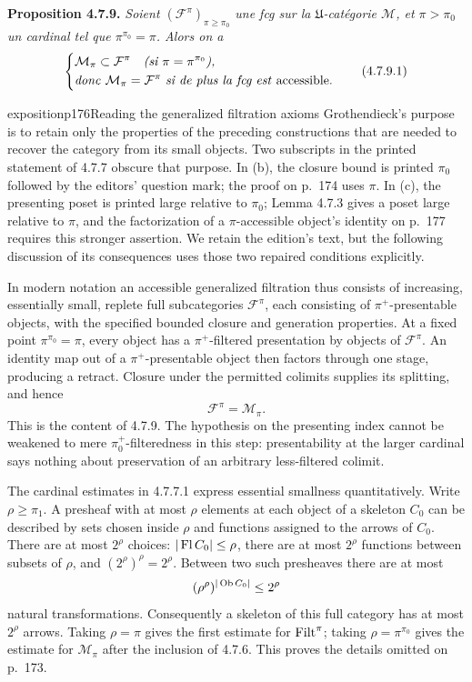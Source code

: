 \textbf{Proposition 4.7.9.} \textit{Soient $(\mathcal{F}^{\pi})_{\pi\geqslant\pi_0}$ une fcg sur la $\mathfrak{U}$-catégorie $\mathcal{M}$, et $\pi>\pi_0$ un cardinal tel que $\pi^{\pi_0}=\pi$. Alors on a}
\[
\left\{
\begin{aligned}
&\mathcal{M}_\pi\subset\mathcal{F}^{\pi}\quad\text{\textit{(si $\pi=\pi^{\pi_0}$),}}\\
&\text{\textit{donc} }\mathcal{M}_\pi=\mathcal{F}^{\pi}\text{ \textit{si de plus la fcg est} accessible.}
\end{aligned}
\right.
\tag*{(4.7.9.1)}
\]

\begin{dcomment}{exposition}{p176}{Reading the generalized filtration axioms}
Grothendieck's purpose is to retain only the properties of the preceding constructions that are needed to recover the category from its small objects. Two subscripts in the printed statement of 4.7.7 obscure that purpose. In (b), the closure bound is printed $\pi_0$ followed by the editors' question mark; the proof on p.~174 uses $\pi$. In (c), the presenting poset is printed large relative to $\pi_0$; Lemma 4.7.3 gives a poset large relative to $\pi$, and the factorization of a $\pi$-accessible object's identity on p.~177 requires this stronger assertion. We retain the edition's text, but the following discussion of its consequences uses those two repaired conditions explicitly.

In modern notation an accessible generalized filtration thus consists of increasing, essentially small, replete full subcategories $\mathcal F^\pi$, each consisting of $\pi^+$-presentable objects, with the specified bounded closure and generation properties. At a fixed point $\pi^{\pi_0}=\pi$, every object has a $\pi^+$-filtered presentation by objects of $\mathcal F^\pi$. An identity map out of a $\pi^+$-presentable object then factors through one stage, producing a retract. Closure under the permitted colimits supplies its splitting, and hence
\[
 \mathcal F^\pi=\mathcal M_\pi.
\]
This is the content of 4.7.9. The hypothesis on the presenting index cannot be weakened to mere $\pi_0^+$-filteredness in this step: presentability at the larger cardinal says nothing about preservation of an arbitrary less-filtered colimit.

The cardinal estimates in 4.7.7.1 express essential smallness quantitatively. Write $\rho\geq\pi_1$. A presheaf with at most $\rho$ elements at each object of a skeleton $C_0$ can be described by sets chosen inside $\rho$ and functions assigned to the arrows of $C_0$. There are at most $2^\rho$ choices: $|\operatorname{Fl} C_0|\leq\rho$, there are at most $2^\rho$ functions between subsets of $\rho$, and $(2^\rho)^\rho=2^\rho$. Between two such presheaves there are at most
\[
 (\rho^\rho)^{|\operatorname{Ob} C_0|}\leq 2^\rho
\]
natural transformations. Consequently a skeleton of this full category has at most $2^\rho$ arrows. Taking $\rho=\pi$ gives the first estimate for $\operatorname{Filt}^\pi$; taking $\rho=\pi^{\pi_0}$ gives the estimate for $\mathcal M_\pi$ after the inclusion of 4.7.6. This proves the details omitted on p.~173.


\end{dcomment}
